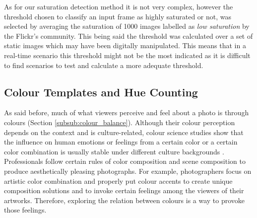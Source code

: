 As for our saturation detection method it is not very complex, however the threshold chosen to classify an input frame as highly saturated or not, was selected by averaging the saturation of 1000 images labelled as \emph{low saturation} by the Flickr's community. This being said the threshold was calculated over a set of static images which may have been digitally manipulated. This means that in a real-time scenario this threshold might not be the most indicated as it is difficult to find scenarios to test and calculate a more adequate threshold.

\subsection{Colour Templates and Hue Counting}
\label{sub:colour}

As said before, much of what viewers perceive and feel about a photo is through colours (Section \ref{subsub:colour_balance}). Although their colour perception depends on the context and is culture-related, colour science studies show that the influence on human emotions or feelings from a certain color or a certain color combination is usually stable under different culture backgrounds \cite{manav2007color}.
Professionals follow certain rules of color composition and scene composition to produce aesthetically pleasing photographs. For example, photographers focus on artistic color combination and properly put colour accents to create unique composition solutions and to invoke certain feelings among the viewers of their artworks. Therefore, exploring the relation between colours is a way to provoke those feelings.

